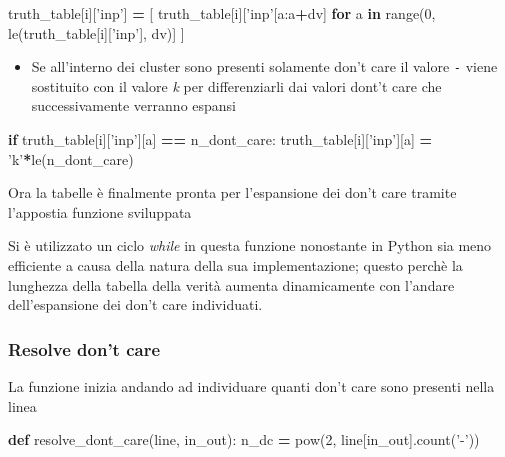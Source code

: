 \documentclass[italian,]{book}
\newenvironment{Shaded}{\begin{snugshade}}{\end{snugshade}}
\newcommand{\BuiltInTok}[1]{#1}
\newcommand{\ControlFlowTok}[1]{\textcolor[rgb]{0.13,0.29,0.53}{\textbf{#1}}}
\newcommand{\DecValTok}[1]{\textcolor[rgb]{0.00,0.00,0.81}{#1}}
\newcommand{\KeywordTok}[1]{\textcolor[rgb]{0.13,0.29,0.53}{\textbf{#1}}}
\newcommand{\NormalTok}[1]{#1}
\newcommand{\OperatorTok}[1]{\textcolor[rgb]{0.81,0.36,0.00}{\textbf{#1}}}
\newcommand{\StringTok}[1]{\textcolor[rgb]{0.31,0.60,0.02}{#1}}
\providecommand{\tightlist}{%
  \setlength{\itemsep}{0pt}\setlength{\parskip}{0pt}}
\begin{document}
\begin{Shaded}
\begin{Highlighting}[]
\NormalTok{truth_table[i][}\StringTok{'inp'}\NormalTok{] }\OperatorTok{=}\NormalTok{ [}
\NormalTok{   truth_table[i][}\StringTok{'inp'}\NormalTok{[a:a}\OperatorTok{+}\NormalTok{dv]}
   \ControlFlowTok{for}\NormalTok{ a }\KeywordTok{in} \BuiltInTok{range}\NormalTok{(}\DecValTok{0}\NormalTok{, le(truth_table[i][}\StringTok{'inp'}\NormalTok{], dv)]}
\NormalTok{ ]}
\end{Highlighting}
\end{Shaded}

\begin{itemize}
\tightlist
\item
  Se all'interno dei cluster sono presenti solamente don't care il valore \texttt{-} viene sostituito con il valore \emph{k} per differenziarli dai valori dont't care che successivamente verranno espansi
\end{itemize}

\begin{Shaded}
\begin{Highlighting}[]
\ControlFlowTok{if}\NormalTok{ truth_table[i][}\StringTok{'inp'}\NormalTok{][a] }\OperatorTok{==}\NormalTok{ n_dont_care:}
\NormalTok{  truth_table[i][}\StringTok{'inp'}\NormalTok{][a] }\OperatorTok{=} \StringTok{'k'}\OperatorTok{*}\NormalTok{le(n_dont_care)}
\end{Highlighting}
\end{Shaded}

Ora la tabelle è finalmente pronta per l'espansione dei don't care tramite l'appostia funzione sviluppata

Si è utilizzato un ciclo \emph{while} in questa funzione nonostante in Python sia meno efficiente a causa della natura della sua implementazione; questo perchè la lunghezza della tabella della verità aumenta dinamicamente con l'andare dell'espansione dei don't care individuati.

\hypertarget{resolve-dont-care}{%
\subsubsection{Resolve don't care}\label{resolve-dont-care}}

La funzione inizia andando ad individuare quanti don't care sono presenti nella linea

\begin{Shaded}
\begin{Highlighting}[]
\KeywordTok{def}\NormalTok{ resolve_dont_care(line, in_out):}
\NormalTok{  n_dc }\OperatorTok{=} \BuiltInTok{pow}\NormalTok{(}\DecValTok{2}\NormalTok{, line[in_out].count(}\StringTok{'-'}\NormalTok{))}
\end{Highlighting}
\end{Shaded}
\end{document}
